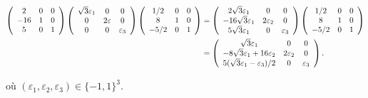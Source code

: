 {{\begin{align*}\ensuremath
\left(
\begin{array}{ccc}
2&0&0\\
-16&1&0\\
5&0&1
\end{array}
\right)\left(
\begin{array}{ccc}
\sqrt{3}\varepsilon_1&0&0\\
0&2\varepsilon&0\\
0&0&\varepsilon_3
\end{array}
\right)\left(
\begin{array}{ccc}
1/2&0&0\\
8&1&0\\
-5/2&0&1
\end{array}
\right)&=\left(
\begin{array}{ccc}
2\sqrt{3}\varepsilon_1&0&0\\
-16\sqrt{3}\varepsilon_1&2\varepsilon_2&0\\
5\sqrt{3}\varepsilon_1&0&\varepsilon_3
\end{array}
\right)\left(
\begin{array}{ccc}
1/2&0&0\\
8&1&0\\
-5/2&0&1
\end{array}
\right)\\
 &=\left(
\begin{array}{ccc}
\sqrt{3}\varepsilon_1&0&0\\
-8\sqrt{3}\varepsilon_1+16\varepsilon_2&2\varepsilon_2&0\\
5(\sqrt{3}\varepsilon_1-\varepsilon_3)/2&0&\varepsilon_3
\end{array}
\right).
\end{align*}

où $(\varepsilon_1, \varepsilon_2,\varepsilon_3)\in\{-1,1\}^3$.}
}
